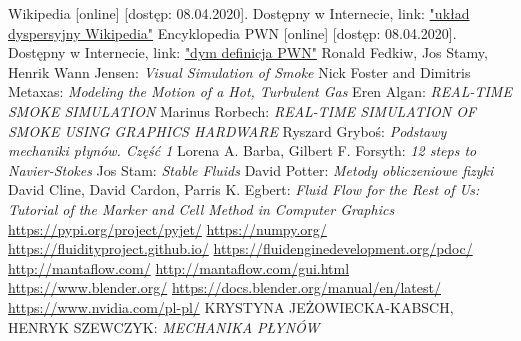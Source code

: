 \documentclass{article}
\begin{document}
	\begin{thebibliography}{}
		 Wikipedia [online] [dostęp: 08.04.2020]. Dostępny w Internecie, link:
		\href{https://pl.wikipedia.org/wiki/Dyspersja_(chemia_fizyczna)}{"układ dyspersyjny Wikipedia"}
		 Encyklopedia PWN [online] [dostęp: 08.04.2020]. Dostępny w Internecie, link: \href{https://encyklopedia.pwn.pl/haslo/dym;3895349.html}{"dym definicja PWN"}
		 Ronald Fedkiw, Jos Stamy, Henrik Wann Jensen: \emph{Visual Simulation of Smoke}
		 Nick Foster and Dimitris Metaxas: \emph{Modeling the Motion of a Hot, Turbulent Gas}
		 Eren Algan: \emph{REAL-TIME SMOKE SIMULATION}
		 Marinus Rorbech: \emph{REAL-TIME SIMULATION OF SMOKE USING GRAPHICS HARDWARE}
		Ryszard Gryboś: \emph{Podstawy mechaniki płynów. Część 1}
		Lorena A. Barba, Gilbert F. Forsyth: \emph{12 steps to Navier-Stokes}
		Jos Stam: \emph{Stable Fluids}
		David Potter: \emph{ Metody obliczeniowe fizyki}
		David Cline, David Cardon, Parris K. Egbert: \emph{Fluid Flow for the Rest of Us: Tutorial of the Marker and Cell Method in Computer Graphics}
		\href{https://pypi.org/project/pyjet/}{https://pypi.org/project/pyjet/}
		\href{https://numpy.org/}{https://numpy.org/}
		\href{https://fluidityproject.github.io/}{https://fluidityproject.github.io/} \href{https://fluidenginedevelopment.org/pdoc/}{https://fluidenginedevelopment.org/pdoc/}
		\href{http://mantaflow.com/}{http://mantaflow.com/}
		\href{http://mantaflow.com/gui.html}{http://mantaflow.com/gui.html}
		\href{https://www.blender.org/}{https://www.blender.org/}
		\href{https://docs.blender.org/manual/en/latest/}{https://docs.blender.org/manual/en/latest/}
		\href{https://www.nvidia.com/pl-pl/}{https://www.nvidia.com/pl-pl/}
		KRYSTYNA JEŻOWIECKA-KABSCH, HENRYK SZEWCZYK: \emph{MECHANIKA PŁYNÓW }
		
		
	\end{thebibliography}
	
\end{document}

